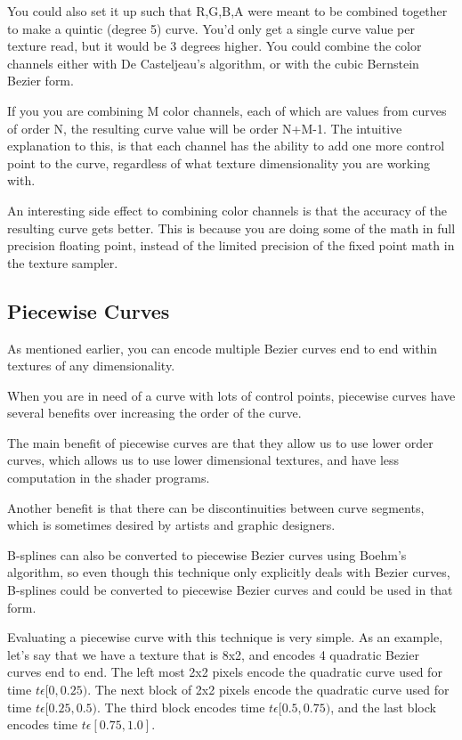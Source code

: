 \documentclass{jcgt}
\begin{document}
You could also set it up such that R,G,B,A were meant to be combined together to make a quintic (degree 5) curve.  You'd only get a single curve value per texture read, but it would be 3 degrees higher.  You could combine the color channels either with De Casteljeau's algorithm, or with the cubic Bernstein Bezier form. 

If you you are combining M color channels, each of which are values from curves of order N, the resulting curve value will be order N+M-1.  The intuitive explanation to this, is that each channel has the ability to add one more control point to the curve, regardless of what texture dimensionality you are working with.

An interesting side effect to combining color channels is that the accuracy of the resulting curve gets better.  This is because you are doing some of the math in full precision floating point, instead of the limited precision of the fixed point math in the texture sampler.

\subsection{Piecewise Curves}

As mentioned earlier, you can encode multiple Bezier curves end to end within textures of any dimensionality.

When you are in need of a curve with lots of control points, piecewise curves have several benefits over increasing the order of the curve.

The main benefit of piecewise curves are that they allow us to use lower order curves, which allows us to use lower dimensional textures, and have less computation in the shader programs.

Another benefit is that there can be discontinuities between curve segments, which is sometimes desired by artists and graphic designers.

B-splines can also be converted to piecewise Bezier curves using Boehm's algorithm, so even though this technique only explicitly deals with Bezier curves, B-splines could be converted to piecewise Bezier curves and could be used in that form.

Evaluating a piecewise curve with this technique is very simple.  As an example, let's say that we have a texture that is 8x2, and encodes 4 quadratic Bezier curves end to end. The left most 2x2 pixels encode the quadratic curve used for time $t \epsilon [0,0.25)$.  The next block of 2x2 pixels encode the quadratic curve used for time $t \epsilon [0.25,0.5)$.  The third block encodes time $t \epsilon [0.5,0.75)$, and the last block encodes time $t \epsilon [0.75,1.0]$.
\end{document}

